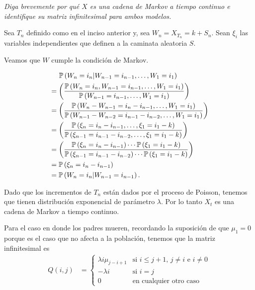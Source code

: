 \emph{
    Diga brevemente por qu\'e $X$ es una cadena de Markov a tiempo continuo e identifique 
    su matriz infinitesimal para ambos modelos.\pn
}
\afterstatement\pn

Sea $T_n$ definido como en el inciso anterior y, sea $W_n = X_{T_n} = k + S_n$. Sean $\xi_i$ las
variables independientes que definen a la caminata aleatoria $S$.\pn

Veamos que $W$ cumple la condición de Markov.

\begin{align}
    &   \;\;\;\;\; \P\left( W_n = i_n | W_{n-1} = i_{n-1}, \dots, W_{1} = i_{1} \right)                                                                                                     \\
    &   =\left(\frac{\P\left( W_n = i_n , W_{n-1} = i_{n-1}, \dots, W_{1} = i_{1} \right)}{\P\left( W_{n-1} = i_{n-1}, \dots, W_{1} = i_{1} \right)}\right)                                              \\
    &   =\left(\frac{\P\left( W_n - W_{n-1} = i_n - i_{n-1}, \dots, W_{1} = i_{1} \right)}{\P\left( W_{n-1} - W_{n-2} = i_{n-1} - i_{n-2}, \dots, W_{1} = i_{1} \right)}\right)                          \\
    &   =\left(\frac{\P\left( \xi_n = i_n - i_{n-1}, \dots, \xi_{1} = i_{1} - k \right)}{\P\left( \xi_{n-1} = i_{n-1} - i_{n-2}, \dots, \xi_{1} = i_{1} - k \right)}\right)                              \\
    &   =\left(\frac{\P\left( \xi_n = i_n - i_{n-1}\right) \cdots \P\left(\xi_{1} = i_{1} - k \right)}{\P\left( \xi_{n-1} = i_{n-1} - i_{n-2}\right) \cdots \P\left(\xi_{1} = i_{1} - k \right)}\right)  \\
    &   =\P\left( \xi_n = i_n - i_{n-1}\right)                                                                                                                                              \\
    &   =\P\left( W_n = i_n | W_{n-1} = i_{n-1} \right).
\end{align}

Dado que los incrementos de $T_n$ están dados por el proceso de Poisson, tenemos que tienen distribución exponencial
de parámetro $\lambda$. Por lo tanto $X_t$ es una cadena de Markov a tiempo continuo.\pn

Para el caso en donde los padres mueren, recordando la suposición de que $\mu_1 = 0$ porque es el caso que no afecta a la población,
tenemos que la matriz infinitesimal es
\begin{align}
        Q(i,j)  &=
                \begin{cases}
                    \lambda i \mu_{j-i+1}   &    \text{si $i \leq j+1$, $j \neq i$ e $i \neq 0$}    \\
                    -\lambda i              &    \text{si $i = j$}                                  \\
                    0                       &    \text{en cualquier otro caso}
                \end{cases}
\end{align}

